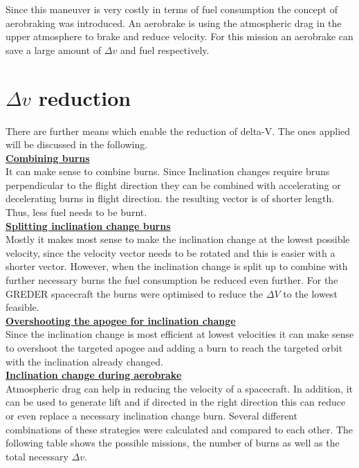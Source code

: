 Since this maneuver is very costly in terms of fuel consumption the concept of aerobraking was
introduced. An aerobrake is using the atmospheric drag in the upper atmosphere to brake and reduce
velocity. For this mission an aerobrake can save a large amount of $\Delta v$ and fuel respectively.
\section{$\Delta v$ reduction}
There are further means which enable the reduction of delta-V. The ones applied will be discussed in the
following.\\
\textbf{\underline{Combining burns}}\\
It can make sense to combine burns. Since Inclination changes require bruns perpendicular to the flight
direction they can be combined with accelerating or decelerating burns in flight direction. the resulting vector is of shorter length. Thus, less fuel needs to be burnt.\\
\textbf{\underline{Splitting inclination change burns}}\\
Mostly it makes most sense to make the inclination change at the lowest possible velocity, since the
velocity vector needs to be rotated and this is easier with a shorter vector. However, when the inclination change is split up to combine with further necessary burns the fuel consumption be reduced even further. For the GREDER spacecraft the burns were optimised to reduce the $\Delta V$ to the lowest feasible.\\
\textbf{\underline{Overshooting the apogee for inclination change}}\\
Since the inclination change is most efficient at lowest velocities it can make sense to overshoot the
targeted apogee and adding a burn to reach the targeted orbit with the inclination already changed.\\
\textbf{\underline{Inclination change during aerobrake}}\\
Atmospheric drag can help in reducing the velocity of a spacecraft. In addition, it can be used to generate lift and if directed in the right direction this can reduce or even replace a necessary inclination change burn. Several different combinations of these strategies were calculated and compared to each other. The following table shows the possible missions, the number of burns as well as the total necessary $\Delta v$.
